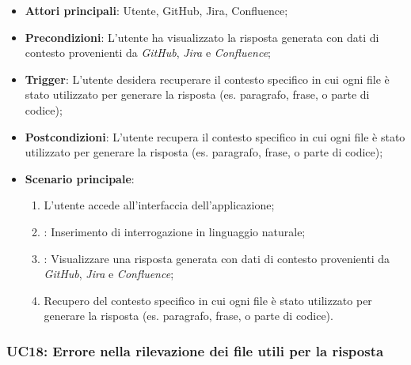\begin{itemize}
    \item \textbf{Attori principali}: Utente, GitHub, Jira, Confluence;
    \item \textbf{Precondizioni}: L'utente ha visualizzato la risposta generata con dati di contesto provenienti da \emph{GitHub}, \emph{Jira} e \emph{Confluence};
    \item \textbf{Trigger}: L'utente desidera recuperare il contesto specifico in cui ogni file è stato utilizzato
    per generare la risposta (es. paragrafo, frase, o parte di codice);
    \item \textbf{Postcondizioni}: L'utente recupera il contesto specifico in cui ogni file è stato utilizzato
    per generare la risposta (es. paragrafo, frase, o parte di codice);
    \item \textbf{Scenario principale}:
    \begin{enumerate}
        \item L'utente accede all'interfaccia dell'applicazione;
        \item {}: Inserimento di interrogazione in linguaggio naturale;
        \item {}: Visualizzare una risposta generata con dati di contesto provenienti da \emph{GitHub}, \emph{Jira} e \emph{Confluence};
        \item Recupero del contesto specifico in cui ogni file è stato utilizzato
        per generare la risposta (es. paragrafo, frase, o parte di codice).
    \end{enumerate}
\end{itemize}


\hypertarget{UC18}{}
\subsubsection{UC18: Errore nella rilevazione dei file utili per la risposta}

